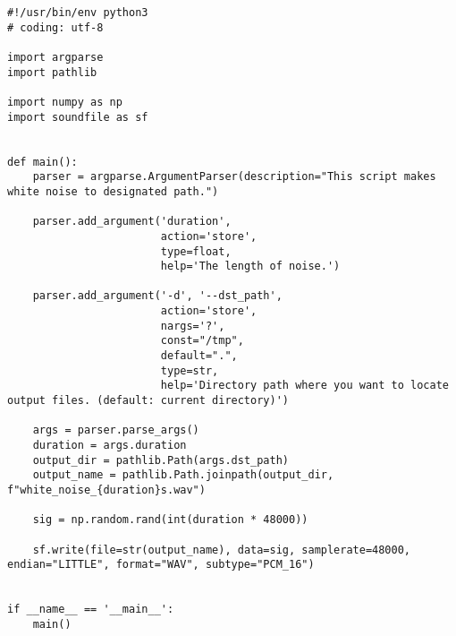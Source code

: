 \begin{lstlisting}[caption=generate\_white\_noise\_as\_wav.py,label=generate_white_noise_as_wav.py]
#!/usr/bin/env python3
# coding: utf-8

import argparse
import pathlib

import numpy as np
import soundfile as sf


def main():
    parser = argparse.ArgumentParser(description="This script makes white noise to designated path.")

    parser.add_argument('duration',
                        action='store',
                        type=float,
                        help='The length of noise.')

    parser.add_argument('-d', '--dst_path',
                        action='store',
                        nargs='?',
                        const="/tmp",
                        default=".",
                        type=str,
                        help='Directory path where you want to locate output files. (default: current directory)')

    args = parser.parse_args()
    duration = args.duration
    output_dir = pathlib.Path(args.dst_path)
    output_name = pathlib.Path.joinpath(output_dir, f"white_noise_{duration}s.wav")

    sig = np.random.rand(int(duration * 48000))

    sf.write(file=str(output_name), data=sig, samplerate=48000, endian="LITTLE", format="WAV", subtype="PCM_16")


if __name__ == '__main__':
    main()
\end{lstlisting}

